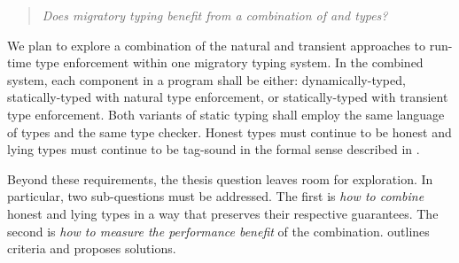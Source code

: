 

\begin{quote}
  \emph{Does migratory typing benefit from a combination of \tdeep{} and \tshallow{} types?}
\end{quote}

We plan to explore a combination of the natural and transient approaches to
 run-time type enforcement within one migratory typing system.
In the combined system, each component in a program shall be either:
 dynamically-typed,
 statically-typed with natural type enforcement,
 or statically-typed with transient type enforcement.
Both variants of static typing shall employ the same language of types and the
 same type checker.
Honest types must continue to be honest
 and lying types must continue to be tag-sound
 in the formal sense described in .

Beyond these requirements, the thesis question leaves room for exploration.
In particular, two sub-questions must be addressed.
The first is \emph{how to combine}\/ honest and lying
 types in a way that preserves their respective guarantees.
The second is \emph{how to measure the performance benefit}\/ of the combination.
 outlines criteria and proposes solutions.

